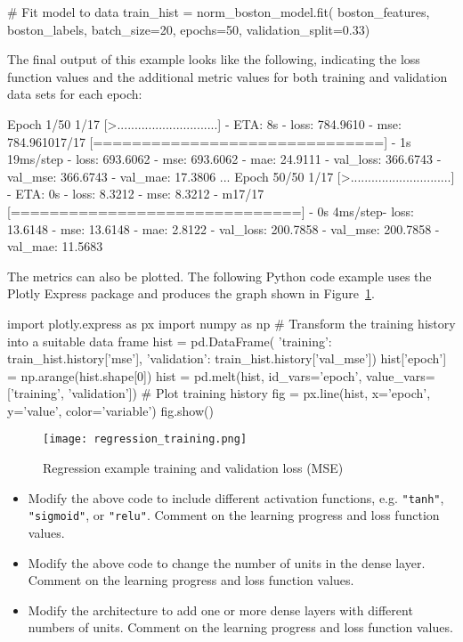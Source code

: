 \begin{pythoncode} 
# Fit model to data
train_hist = norm_boston_model.fit(
                    boston_features, 
                    boston_labels, 
                    batch_size=20,
                    epochs=50,
                    validation_split=0.33)
\end{pythoncode}

The final output of this example looks like the following, indicating the loss function values and the additional metric values for both training and validation data sets for each epoch:

\begin{textcode}
Epoch 1/50
 1/17 [>.............................] - ETA: 8s - loss: 784.9610 - 
 mse: 784.961017/17 [==============================] - 1s 19ms/step - 
 loss: 693.6062 - mse: 693.6062 - mae: 24.9111 - val_loss: 366.6743 - 
 val_mse: 366.6743 - val_mae: 17.3806
...
Epoch 50/50
 1/17 [>.............................] - ETA: 0s - loss: 8.3212 - 
 mse: 8.3212 - m17/17 [==============================] - 0s 4ms/step- 
 loss: 13.6148 - mse: 13.6148 - mae: 2.8122 - val_loss: 200.7858 - 
 val_mse: 200.7858 - val_mae: 11.5683
\end{textcode}

The metrics can also be plotted. The following Python code example uses the Plotly Express package and produces the graph shown in Figure~\ref{fig:regressiontraining}.

\begin{pythoncode}
import plotly.express as px
import numpy as np
# Transform the training history into a suitable data frame
hist = pd.DataFrame({
    'training':   train_hist.history['mse'],
    'validation': train_hist.history['val_mse']})
hist['epoch'] = np.arange(hist.shape[0])
hist = pd.melt(hist, id_vars='epoch', 
                     value_vars=['training', 'validation'])
# Plot training history
fig = px.line(hist, x='epoch', y='value', color='variable')
fig.show()
\end{pythoncode}

\begin{figure}
\centering
\texttt{[image: regression\_training.png]}
\caption{Regression example training and validation loss (MSE)}
\label{fig:regressiontraining}
\end{figure}

\begin{exercisebox}

\begin{itemize}
  \item Modify the above code to include different activation functions, e.g. \texttt{"tanh"}, \texttt{"sigmoid"}, or \texttt{"relu"}. Comment on the learning progress and loss function values.
  \item Modify the above code to change the number of units in the dense layer. Comment on the learning progress and loss function values.
  \item Modify the architecture to add one or more dense layers with different numbers of units. Comment on the learning progress and loss function values.
\end{itemize}
\end{exercisebox}

